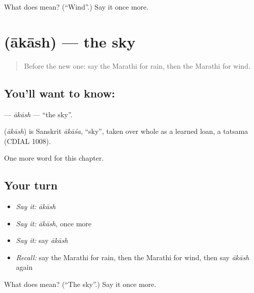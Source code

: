 \begin{tcolorbox}[breakable,colback=teal!4,colframe=teal!35!black,title={Before you move on}]
What does  mean? (\textquotedblleft{}Wind\textquotedblright{}.) Say it once more.
\end{tcolorbox}
\section[\texorpdfstring{\mr{आकाश} (ākāsh)}{आकाश (ākāsh)}]{ (ākāsh) — the sky}

\label{lesson:MR-C99-akash}



\begin{quote}
Before the new one: say the Marathi for rain, then the Marathi for wind.
\end{quote}

\subsection*{You'll want to know: }
\textbf{} — \emph{ākāsh} — \textquotedblleft{}the sky\textquotedblright{}.

\begin{cousinweb}
\textbf{} (\emph{ākāsh}) is Sanskrit \emph{ākāśa}, \textquotedblleft{}sky\textquotedblright{}, taken over whole as a learned loan, a tatsama (CDIAL 1008).
\end{cousinweb}

\begin{grammarlens}[title={What you've built}]
One more word for this chapter.
\end{grammarlens}

\subsection*{Your turn}
\begin{itemize}
\raggedright
  \item \emph{Say it:} \emph{ākāsh}
  \item \emph{Say it:} \emph{ākāsh}, once more
  \item \emph{Say it:} say \emph{ākāsh}
  \item \emph{Recall:} say the Marathi for rain, then the Marathi for wind, then say \emph{ākāsh} again
\end{itemize}

\begin{tcolorbox}[breakable,colback=teal!4,colframe=teal!35!black,title={Before you move on}]
What does  mean? (\textquotedblleft{}The sky\textquotedblright{}.) Say it once more.
\end{tcolorbox}
